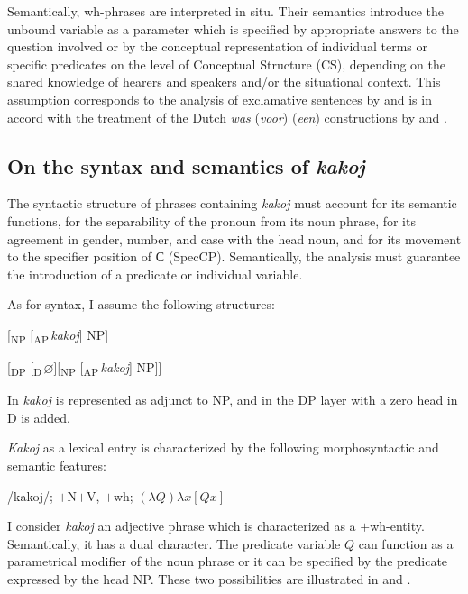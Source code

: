 \documentclass[output=paper,colorlinks,citecolor=brown]{langscibook}
\begin{document}
Semantically,  wh-phrases are interpreted in situ. Their semantics introduce the unbound variable as a parameter which is specified by appropriate answers to the question involved or by the conceptual representation of individual terms or specific predicates on the level of Conceptual Structure (CS), depending on the shared knowledge of hearers and speakers and/or the situational context. This assumption corresponds to the analysis of exclamative sentences by \citet{zi08:Zybatow1990} and is in accord with the treatment of the Dutch \textit{was} (\textit{voor}) (\textit{een}) constructions by \citet{Bennis1995} and \citet{Bennis-Corver-etal1998}.

\subsection{On the syntax and semantics of \textit{kakoj}} \label{subsec3.2}

The syntactic structure of phrases containing \textit{kakoj} must account for its semantic functions, for the separability of the pronoun from its noun phrase, for its agreement in gender, number, and case with the head noun, and for its movement to the specifier position of С (SpecCP). Semantically, the analysis must guarantee the introduction of a predicate or individual variable. 

As for syntax, I assume the following structures:

\ea \label{ex:zi08:27} [\textsubscript{NP} [\textsubscript{AP}\,\textit{kakoj}] NP]
\z

\ea \label{ex:zi08:28} [\textsubscript{DP} [\textsubscript{D}\,$\varnothing$][\textsubscript{NP} [\textsubscript{AP}\,\textit{kakoj}] NP]]
\z

\noindent In  \textit{kakoj} is represented as adjunct to NP, and in  the DP layer with a zero head in D is added. 

\textit{Kakoj} as a lexical entry is characterized by the following morphosyntactic and semantic features:

\ea \label{ex:zi08:29} /kakoj/; $+$N$+$V, $+$wh; $(\lambda Q) \lambda x [Q x]$
\z

\noindent I consider \textit{kakoj} an adjective phrase which is characterized as a $+$wh-entity. Semantically, it has a dual character. The predicate variable $Q$ can function as a parametrical modifier of the noun phrase or it can be specified by the predicate expressed by the head NP. These two possibilities are illustrated in  and .
\end{document}
